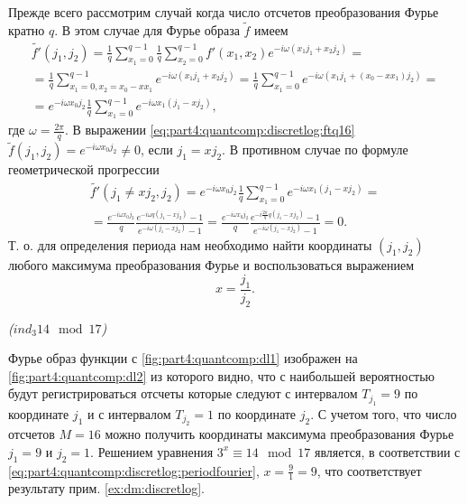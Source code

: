 Прежде всего рассмотрим случай когда число отсчетов преобразования
Фурье кратно $q$. В этом случае для Фурье образа $\tilde{f}$ имеем
\begin{eqnarray}
\tilde{f'}\left(j_1, j_2\right) = 
\frac{1}{q}\sum_{x_1 = 0}^{q-1}
\frac{1}{q}\sum_{x_2 = 0}^{q-1} 
f'\left(x_1, x_2\right)e^{-i \omega\left(x_1 j_1 + x_2j_2\right)} =
\nonumber \\
= \frac{1}{q}\sum_{x_1 = 0, x_2 = x_0 - x x_1}^{q-1}
e^{-i \omega\left(x_1 j_1 + x_2 j_2\right)} = 
 \frac{1}{q}\sum_{x_1 = 0}^{q-1}e^{-i \omega\left(x_1 j_1 + (x_0 - x
   x_1) j_2\right)} = 
\nonumber \\
= e^{-i \omega x_0 j_2}\frac{1}{q}\sum_{x_1 = 0}^{q-1}e^{-i
  \omega x_1 \left(j_1 - x j_2\right)},
\label{eq:part4:quantcomp:discretlog:ftq16}
\end{eqnarray}
где $\omega = \frac{2 \pi}{q}$. В выражении
\eqref{eq:part4:quantcomp:discretlog:ftq16} $\tilde{f}(j_1, j_2) =
e^{-i \omega x_0 j_2} \ne 0$, если $j_1 = x j_2$. 
В противном случае по формуле геометрической прогрессии 
\begin{eqnarray}
\tilde{f'}\left(j_1 \ne x j_2, j_2\right) = 
e^{-i \omega x_0 j_2}\frac{1}{q}\sum_{x_1 = 0}^{q-1}e^{-i
  \omega x_1 \left(j_1 - x j_2\right)} = 
\nonumber \\
=
\frac{e^{-i \omega x_0 j_2}}{q} \frac{e^{-i
  \omega q \left(j_1 - x j_2\right)} - 1}{e^{-i
  \omega \left(j_1 - x j_2\right)} - 1} = 
 \frac{e^{-i \omega x_0 j_2}}{q} 
\frac{e^{-i \frac{2 \pi}{q} q \left(j_1 - x j_2\right)} - 1}{e^{-i
  \omega \left(j_1 - x j_2\right)} - 1} = 0.
\nonumber
\end{eqnarray} 
Т. о. для определения периода нам необходимо найти координаты $(j_1, j_2)$
любого максимума преобразования Фурье и воспользоваться выражением 
\begin{equation}
x = \frac{j_1}{j_2}.
\label{eq:part4:quantcomp:discretlog:periodfourier}
\end{equation}

\begin{example}
\emph{($ind_3{14} \mod{17}$)}
%



Фурье образ функции с \autoref{fig:part4:quantcomp:dl1} изображен на
\autoref{fig:part4:quantcomp:dl2} из которого видно, что с наибольшей
вероятностью будут регистрироваться отсчеты которые следуют с
интервалом $T_{j_1} = 9$ по координате $j_1$ и с интервалом $T_{j_2} =
1$ по координате $j_2$. С учетом того, что число отсчетов $M=16$ можно
получить координаты максимума преобразования Фурье $j_1 = 9$
и $j_2 = 1$. Решением уравнения $3^x \equiv 14 \mod 17$
является, в соответствии с
\eqref{eq:part4:quantcomp:discretlog:periodfourier}, $x = \frac{9}{1}
= 9$, что соответствует результату прим. 
\ref{ex:dm:discretlog}.

\label{ex:part4:quantcomp:discretlog:periodfinding}
\end{example}

